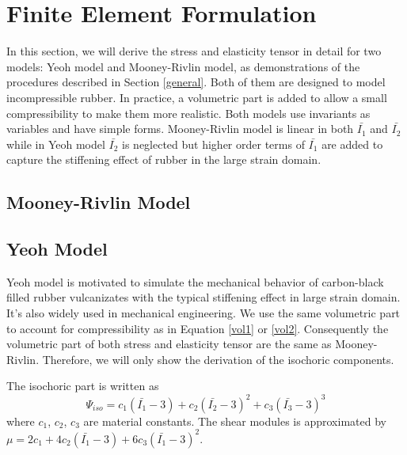 \section{Finite Element Formulation}
In this section, we will derive the stress and elasticity tensor in detail for two models: Yeoh model and Mooney-Rivlin model, as demonstrations of the procedures described in Section \ref{general}. Both of them are designed to model incompressible rubber. In practice, a volumetric part is added to allow a small compressibility to make them more realistic.  Both models use invariants as variables and have simple forms. Mooney-Rivlin model is linear in both $\bar{I_1}$ and $\bar{I_2}$ while in Yeoh model $\bar{I_2}$ is neglected but higher order terms of $\bar{I_1}$ are added to capture the stiffening effect of rubber in the large strain domain.

%
\subsection{Mooney-Rivlin Model}

%
\subsection{Yeoh Model}
Yeoh model is motivated to simulate the mechanical behavior of carbon-black filled rubber vulcanizates with the typical stiffening effect in large strain domain. It's also widely used in mechanical engineering. We use the same volumetric part to account for compressibility as in Equation \ref{vol1} or \ref{vol2}. Consequently the volumetric part of both stress and elasticity tensor are the same as Mooney-Rivlin. Therefore, we will only show the derivation of the isochoric components.

%
The isochoric part is written as
\begin{equation} \label{isopart}
\Psi_{iso} = c_1(\bar{I_1} - 3) + c_2(\bar{I_2} - 3)^2 + c_3(\bar{I_3} - 3)^3
\end{equation}
where $c_1$, $c_2$, $c_3$ are material constants. The shear modules is approximated by $\mu = 2c_1 + 4c_2(\bar{I_1} - 3) + 6c_3(\bar{I_1} - 3)^2$.

